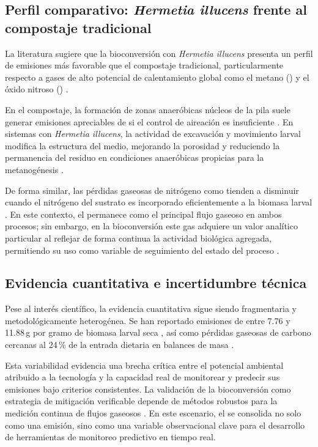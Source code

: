 \subsection{Perfil comparativo: \textit{Hermetia illucens} frente al compostaje tradicional}

La literatura sugiere que la bioconversión con \textit{Hermetia illucens} presenta un perfil de emisiones más favorable que el compostaje tradicional, particularmente respecto a gases de alto potencial de calentamiento global como el metano () y el óxido nitroso () \parencite{pangReducingGreenhouseGas2020,ermolaevGreenhouseGasEmissions2019,parodiBlackSoldierFly2021a,mertenatBlackSoldierFly2019}. 

En el compostaje, la formación de zonas anaeróbicas núcleos de la pila suele generar emisiones apreciables de  si el control de aireación es insuficiente \parencite{nordahlGreenhouseGasAir2023a}. En sistemas con \textit{Hermetia illucens}, la actividad de excavación y movimiento larval modifica la estructura del medio, mejorando la porosidad y reduciendo la permanencia del residuo en condiciones anaeróbicas propicias para la metanogénesis \parencite{pangReducingGreenhouseGas2020,parodiBlackSoldierFly2021a}. 

De forma similar, las pérdidas gaseosas de nitrógeno como  tienden a disminuir cuando el nitrógeno del sustrato es incorporado eficientemente a la biomasa larval \parencite{parodiBioconversionEfficienciesGreenhouse2020a,parodiBlackSoldierFly2021a}. En este contexto, el  permanece como el principal flujo gaseoso en ambos procesos; sin embargo, en la bioconversión este gas adquiere un valor analítico particular al reflejar de forma continua la actividad biológica agregada, permitiendo su uso como variable de seguimiento del estado del proceso \parencite{eriksenDynamicModellingFeed2022,rossiEstimatingDynamicsGreenhouse2024a}.

\subsection{Evidencia cuantitativa e incertidumbre técnica}

Pese al interés científico, la evidencia cuantitativa sigue siendo fragmentaria y metodológicamente heterogénea. Se han reportado emisiones de  entre 7.76 y 11.88\,g por gramo de biomasa larval seca \parencite{rossiEstimatingDynamicsGreenhouse2024a}, así como pérdidas gaseosas de carbono cercanas al 24\,\% de la entrada dietaria en balances de masa \parencite{parodiBioconversionEfficienciesGreenhouse2020a}. 

Esta variabilidad evidencia una brecha crítica entre el potencial ambiental atribuido a la tecnología y la capacidad real de monitorear y predecir sus emisiones bajo criterios consistentes. La validación de la bioconversión como estrategia de mitigación verificable depende de métodos robustos para la medición continua de flujos gaseosos \parencite{nordahlGreenhouseGasAir2023a,rossiEstimatingDynamicsGreenhouse2024a}. En este escenario, el  se consolida no solo como una emisión, sino como una variable observacional clave para el desarrollo de herramientas de monitoreo predictivo en tiempo real.